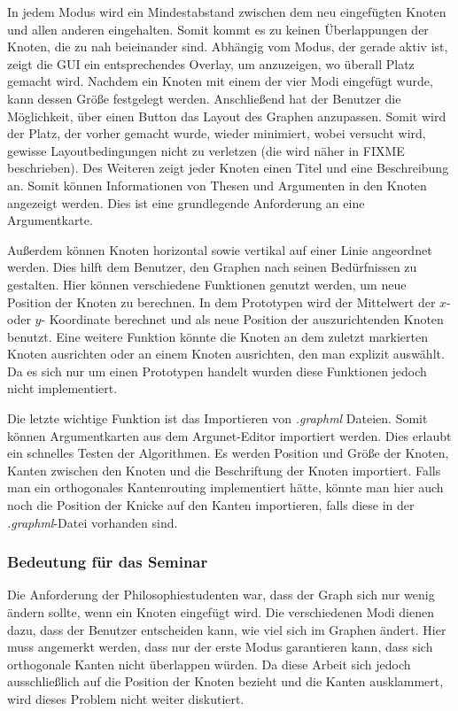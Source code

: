 In jedem Modus wird ein Mindestabstand zwischen dem neu eingefügten Knoten und allen
anderen eingehalten. Somit kommt es zu keinen Überlappungen der Knoten, die zu nah
beieinander sind. Abhängig vom Modus, der gerade aktiv ist, zeigt die GUI ein entsprechendes
Overlay, um anzuzeigen, wo überall Platz gemacht wird. Nachdem ein Knoten mit einem der
vier Modi eingefügt wurde, kann dessen Größe festgelegt werden. Anschließend hat der
Benutzer die Möglichkeit, über einen Button das Layout des Graphen anzupassen. Somit wird
der Platz, der vorher gemacht wurde, wieder minimiert, wobei versucht wird, gewisse
Layoutbedingungen nicht zu verletzen (die wird näher in FIXME beschrieben).
Des Weiteren zeigt jeder Knoten einen Titel und eine Beschreibung an. Somit können
Informationen von Thesen und Argumenten in den Knoten angezeigt werden. Dies ist eine
grundlegende Anforderung an eine Argumentkarte.

Außerdem können Knoten horizontal sowie vertikal auf einer Linie angeordnet werden. Dies
hilft dem Benutzer, den Graphen nach seinen Bedürfnissen zu gestalten. Hier können
verschiedene Funktionen genutzt werden, um neue Position der Knoten zu berechnen. In
dem Prototypen wird der Mittelwert der $x$- oder $y$- Koordinate berechnet und als neue Position
der auszurichtenden Knoten benutzt. Eine weitere Funktion könnte die Knoten an dem zuletzt
markierten Knoten ausrichten oder an einem Knoten ausrichten, den man explizit auswählt.
Da es sich nur um einen Prototypen handelt wurden diese Funktionen jedoch nicht
implementiert.

Die letzte wichtige Funktion ist das Importieren von \textit{.graphml} Dateien. Somit können
Argumentkarten aus dem Argunet-Editor importiert werden. Dies erlaubt ein schnelles Testen
der Algorithmen. Es werden Position und Größe der Knoten, Kanten zwischen den Knoten
und die Beschriftung der Knoten importiert. Falls man ein orthogonales Kantenrouting
implementiert hätte, könnte man hier auch noch die Position der Knicke auf den Kanten
importieren, falls diese in der \textit{.graphml}-Datei vorhanden sind.

\subsubsection{Bedeutung für das Seminar}

Die Anforderung der Philosophiestudenten war, dass der Graph sich nur wenig ändern sollte,
wenn ein Knoten eingefügt wird. Die verschiedenen Modi dienen dazu, dass der Benutzer
entscheiden kann, wie viel sich im Graphen ändert. Hier muss angemerkt werden, dass nur
der erste Modus garantieren kann, dass sich orthogonale Kanten nicht überlappen würden.
Da diese Arbeit sich jedoch ausschließlich auf die Position der Knoten bezieht und die Kanten
ausklammert, wird dieses Problem nicht weiter diskutiert.

